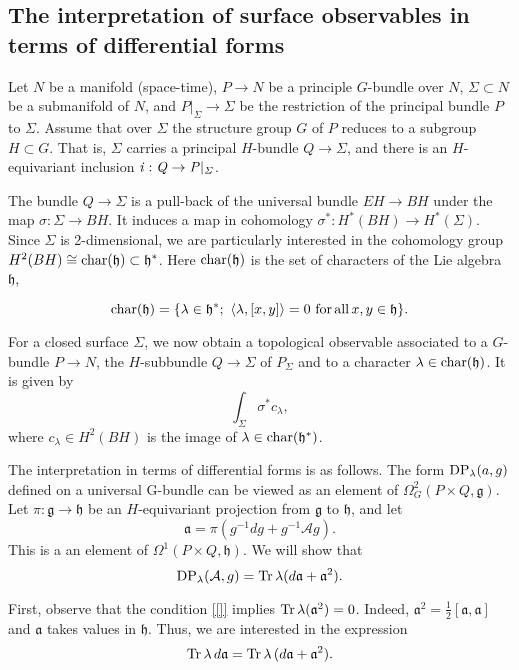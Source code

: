 \documentclass[11pt]{report}
\theoremstyle{plain}
\theoremstyle{definition}
\theoremstyle{remark}
\theoremstyle{remark}
\numberwithin{equation}{section}
\begin{document}
\subsection{The interpretation of surface observables in terms of differential forms} \label{5.1}
Let $N$ be a manifold (space-time), $P\to N$ be a principle $G$-bundle over $N$, 
$\Sigma \subset N$ be a submanifold of $N$,  and $P|_\Sigma \to \Sigma$ be the restriction of the principal bundle $P$ to $\Sigma$. Assume that over $\Sigma$ the structure group $G$ of $P$ reduces to a subgroup $H \subset G$. That is, $\Sigma$ carries a principal $H$-bundle $Q \to \Sigma$, and there is an $H$-equivariant inclusion $ \it{i}: Q \to P|_\Sigma$. 

The bundle $Q \to \Sigma$ is a pull-back of the universal bundle $EH\to BH$ under the map $\sigma: \Sigma \to BH$.
It induces a map in cohomology $\sigma^*: H^*(BH) \to H^*(\Sigma)$. Since $\Sigma$ is 2-dimensional, we are particularly interested in the cohomology group $H^2(BH) \cong {\rm char}(\mathfrak{h}) \subset \mathfrak{h}^*$. Here ${\rm char}(\mathfrak{h})$ is the set of characters of the Lie algebra $\mathfrak{h}$,

\begin{equation} \label{[]}
{\rm char}(\mathfrak{h})=\{ \lambda \in \mathfrak{h}^*; \,\,  \langle \lambda, [x,y] \rangle =0 \,\,  {\rm for \, all} \, x,y \in \mathfrak{h} \} .
\end{equation}

For a closed surface $\Sigma$, we now obtain a topological observable associated  to a $G$-bundle
$P \to N$, the $H$-subbundle $Q \to \Sigma$ of $P_\Sigma$ and to a character $\lambda \in {\rm char}(\mathfrak{h})$. 
It is given by
%
$$
\int_\Sigma \sigma^* c_\lambda,
$$
where $c_\lambda \in H^2(BH)$ is the image of  $\lambda \in {\rm char}(\mathfrak{h}^*)$.

The interpretation in terms of differential forms is as follows. The form ${\rm DP}_\lambda(a,g)$ defined on a universal G-bundle can be viewed as an element of $\Omega_G^2(P \times Q , \mathfrak{g})$. Let $\pi: \mathfrak{g} \to \mathfrak{h}$ be an $H$-equivariant projection from $\mathfrak{g}$ to $\mathfrak{h}$, and let
%
$$
\mathfrak{a} = \pi(g^{-1} dg + g^{-1} \mathcal{A} g).
$$
This is a an element of $\Omega^1(P \times Q, \mathfrak{h})$. We will show that
%
$$
{\rm DP}_\lambda(\mathcal{A},g) = {\rm Tr}\, \lambda (d\mathfrak{a} + \mathfrak{a}^2).
$$

First, observe that the condition \eqref{[]} implies ${\rm Tr} \, \lambda (\mathfrak{a}^2) = 0$. Indeed,  $\mathfrak{a}^2 = \frac{1}{2} [\mathfrak{a},\mathfrak{a}]$ and $\mathfrak{a}$ takes values in $\mathfrak{h}$. Thus, we are interested in the expression 
$${\rm Tr} \, \lambda \, d\mathfrak{a} = {\rm Tr} \, \lambda\, (d\mathfrak{a} + \mathfrak{a}^2).$$
\end{document}
